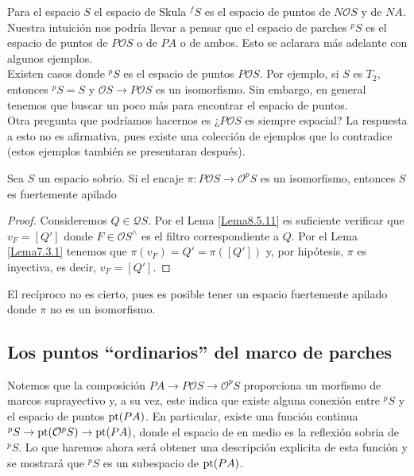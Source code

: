Para el espacio $S$ el espacio de Skula $^fS$ es el espacio de puntos de $N\mathcal{O}S$ y de $NA$. Nuestra intuición nos podría llevar a pensar que el espacio de parches $^pS$ es el espacio de puntos de $P\mathcal{O}S$ o de $PA$ o de ambos. Esto se aclarara más adelante con algunos ejemplos.\\

Existen casos donde $^pS$ es el espacio de puntos $P\mathcal{O}S$. Por ejemplo, si $S$ es $T_2$, entonces $^pS=S$ y $\mathcal{O}S\to P\mathcal{O}S$ es un isomorfismo. Sin embargo, en general tenemos que buscar un poco más para encontrar el espacio de puntos.\\

Otra pregunta que podríamos hacernos es ¿$P\mathcal{O}S$ es siempre espacial?
La respuesta a esto no es afirmativa, pues existe una colección de ejemplos que lo contradice (estos ejemplos también se presentaran después).

\begin{lem}\label{Lema9.2.3}
    Sea $S$ un espacio sobrio. Si el encaje $\pi\colon P\mathcal{O}S\to \mathcal{O}^pS$ es un isomorfismo, entonces $S$ es fuertemente apilado
\end{lem}

\begin{proof}
    Consideremos $Q\in \mathcal{Q}S$. Por el Lema \ref{Lema8.5.11} es suficiente verificar que $v_F=[Q']$ donde $F\in \mathcal{O}S^\wedge$ es el filtro correspondiente a $Q$. Por el Lema \ref{Lema7.3.1} tenemos que $\pi(v_F)=Q'=\pi([Q'])$ y, por hipótesis, $\pi$ es inyectiva, es decir, $v_F=[Q']$.
\end{proof}

El recíproco no es cierto, pues es posible tener un espacio fuertemente apilado donde $\pi$ no es un isomorfismo.

\subsection{Los puntos ``ordinarios'' del marco de parches}

Notemos que la composición $PA\to P\mathcal{O}S\to \mathcal{O}^pS$ proporciona un morfismo de marcos suprayectivo y, a su vez, este indica que existe alguna conexión entre $^pS$ y el espacio de puntos $\mathrm{pt}(PA)$. En particular, existe una función continua $^pS\to \mathrm{pt}(\mathcal{O}^pS)\to \mathrm{pt} (PA)$, donde el espacio de en medio es la reflexión sobria de $^pS$. Lo que haremos ahora será obtener una descripción explicita de esta función y se mostrará que $^pS$ es un subespacio de $\mathrm{pt} (PA)$.\\

